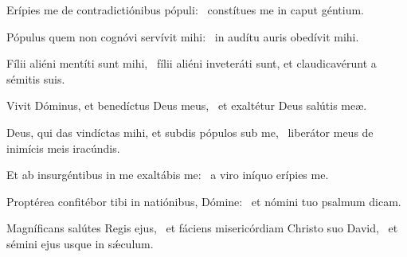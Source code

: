\item Erípies me de contradictiónibus pópuli:~\psstar{} constítues me in caput géntium.

\item Pópulus quem non cognóvi servívit mihi:~\psstar{} in audítu auris obedívit mihi.

\item Fílii aliéni mentíti sunt mihi,~\psstar{} fílii aliéni inveteráti sunt, et claudicavérunt a sémitis suis.

\item Vivit Dóminus, et benedíctus Deus meus,~\psstar{} et exaltétur Deus salútis meæ.

\item Deus, qui das vindíctas mihi, et subdis pópulos sub me,~\psstar{} liberátor meus de inimícis meis iracúndis.

\item Et ab insurgéntibus in me exaltábis me:~\psstar{} a viro iníquo erípies me.

\item Proptérea confitébor tibi in natiónibus, Dómine:~\psstar{} et nómini tuo psalmum dicam.

\item Magníficans salútes Regis ejus,~\pscross{} et fáciens misericórdiam Christo suo David,~\psstar{} et sémini ejus usque in sǽculum.